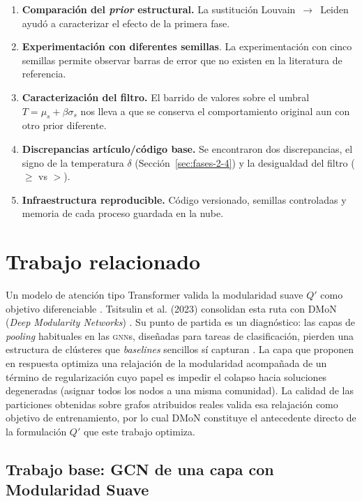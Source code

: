 \documentclass[twoside,twocolumn,10pt]{article}
\begin{document}
\begin{enumerate}
    \item \textbf{Comparación del \textit{prior} estructural.} La sustitución Louvain~$\to$~Leiden ayudó a caracterizar el efecto de la primera fase.
    \item \textbf{Experimentación con diferentes semillas}. La experimentación con cinco semillas permite observar barras de error que no existen en la literatura de referencia.
    \item \textbf{Caracterización del filtro.} El barrido de valores sobre el umbral $T = \mu_s + \beta\sigma_s$ nos lleva a que se conserva el comportamiento original aun con otro prior diferente.
    \item \textbf{Discrepancias artículo/código base.} Se encontraron dos discrepancias, el signo de la temperatura $\delta$ (Sección~\ref{sec:fases-2-4}) y la desigualdad del filtro ($\geq$ vs $>$).
    \item \textbf{Infraestructura reproducible.} Código versionado, semillas controladas y memoria de cada proceso guardada en la nube.
\end{enumerate}

\section{Trabajo relacionado}
\label{sec:trabajo-relacionado}
\fontsize{10}{12}\selectfont

Un modelo de atención tipo Transformer valida la modularidad suave $Q'$ como objetivo diferenciable \cite{Lobov2019}. Tsitsulin et al. (2023) consolidan esta ruta con DMoN (\textit{Deep Modularity Networks}) \cite{tsitsulin2023}. Su punto de partida es un diagnóstico: las capas de \textit{pooling} habituales en las \textsc{gnn}s, diseñadas para tareas de clasificación, pierden una estructura de clústeres que \textit{baselines} sencillos sí capturan \cite{tsitsulin2023}. La capa que proponen en respuesta optimiza una relajación de la modularidad acompañada de un término de regularización cuyo papel es impedir el colapso hacia soluciones degeneradas (asignar todos los nodos a una misma comunidad). La calidad de las particiones obtenidas sobre grafos atribuidos reales valida esa relajación como objetivo de entrenamiento, por lo cual DMoN constituye el antecedente directo de la formulación $Q'$ que este trabajo optimiza.

\subsection{Trabajo base: GCN de una capa con Modularidad Suave}
\label{subsec:trabajo-base-wang}
\end{document}

